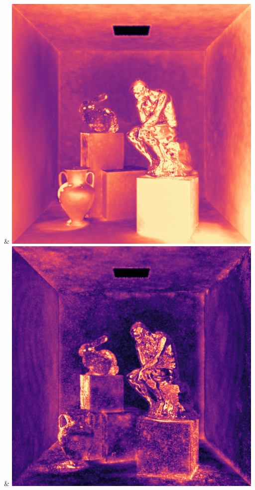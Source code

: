 & \includegraphics[width=\linewidth]{figures/py/tests/quality_comparison/nrc+pt+sl_1spp_thinker_flip.png}
& \includegraphics[width=\linewidth]{figures/py/tests/quality_comparison/nrc+bt_1spp_thinker_flip.png}
